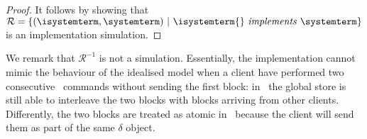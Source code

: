 \begin{proof}
It follows by showing that $\mathcal{R} = \{ (\isystemterm, \systemterm) \ |\ \implements{\isystemterm{}}{\systemterm} \}$ is an 
implementation simulation.
\end{proof}

We remark that  $\mathcal{R}^{-1}$ is not a simulation. Essentially,  the implementation cannot mimic  the 
behaviour of the idealised model when a client  have performed two 
consecutive \pushcmd\ commands without sending the first block: in \gsp\, the global store is still able to interleave the two 
blocks with blocks arriving from other clients. Differently, the two blocks are treated as atomic in \igsp\  
because the client will send them as part of the same $\delta$ object. 
